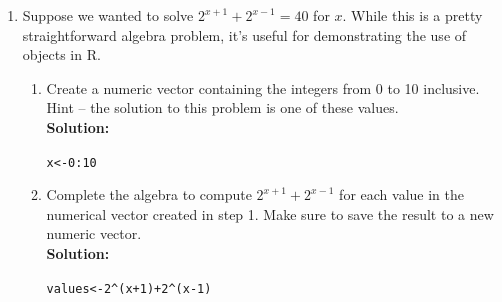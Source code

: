 \documentclass{article}\usepackage[]{graphicx}\usepackage[]{xcolor}
\makeatletter
\newcommand{\hlnum}[1]{\textcolor[rgb]{0.686,0.059,0.569}{#1}}%
\newcommand{\hlopt}[1]{\textcolor[rgb]{0,0,0}{#1}}%
\newcommand{\hldef}[1]{\textcolor[rgb]{0.345,0.345,0.345}{#1}}%
\newcommand{\hlkwb}[1]{\textcolor[rgb]{0.69,0.353,0.396}{#1}}%
\newenvironment{kframe}{%
 \def\at@end@of@kframe{}%
 \ifinner\ifhmode%
  \def\at@end@of@kframe{\end{minipage}}%
  \begin{minipage}{\columnwidth}%
 \fi\fi%
 \def\FrameCommand##1{\hskip\@totalleftmargin \hskip-\fboxsep
 \colorbox{shadecolor}{##1}\hskip-\fboxsep
     \hskip-\linewidth \hskip-\@totalleftmargin \hskip\columnwidth}%
 \MakeFramed {\advance\hsize-\width
   \@totalleftmargin\z@ \linewidth\hsize
   \@setminipage}}%
 {\par\unskip\endMakeFramed%
 \at@end@of@kframe}
\newenvironment{knitrout}{}{} %
\makeatother
\begin{document}
\begin{enumerate}
\newpage

\item Suppose we wanted to solve $2^{x+1} +2^{x-1} = 40$ for $x$. While this is a pretty straightforward algebra problem, it's useful for demonstrating the use of objects in R. 
  \begin{enumerate}
  \item Create a numeric vector containing the integers from 0 to 10 inclusive. Hint -- the solution to this problem is one of these values.\\
\textbf{Solution:}
\begin{knitrout}
\color{fgcolor}\begin{kframe}
\begin{alltt}
\hldef{x} \hlkwb{<-} \hlnum{0}\hlopt{:}\hlnum{10}
\end{alltt}
\end{kframe}
\end{knitrout}

  \item Complete the algebra to compute $2^{x+1} +2^{x-1}$ for each value in the numerical vector created in step 1. Make sure to save the result to a new numeric vector.\\
\textbf{Solution:}
\begin{knitrout}
\color{fgcolor}\begin{kframe}
\begin{alltt}
\hldef{values} \hlkwb{<-} \hlnum{2}\hlopt{^}\hldef{(x}\hlopt{+}\hlnum{1}\hldef{)}\hlopt{+}\hlnum{2}\hlopt{^}\hldef{(x}\hlopt{-}\hlnum{1}\hldef{)}
\end{alltt}
\end{kframe}
\end{knitrout}


\end{enumerate}
\end{enumerate}
\end{document}
